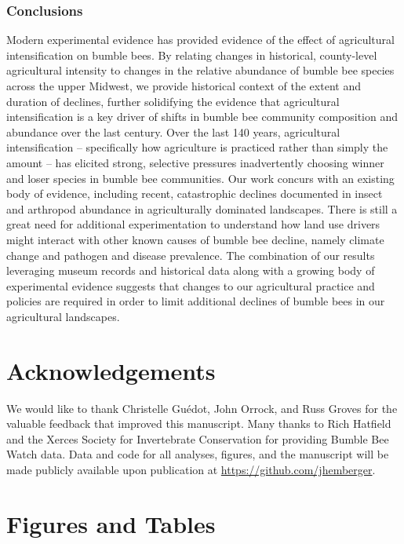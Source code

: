 \documentclass[11pt,]{article}
\begin{document}
\hypertarget{conclusions}{%
\subsubsection{Conclusions}\label{conclusions}}

Modern experimental evidence has provided evidence of the effect of
agricultural intensification on bumble bees. By relating changes in
historical, county-level agricultural intensity to changes in the
relative abundance of bumble bee species across the upper Midwest, we
provide historical context of the extent and duration of declines,
further solidifying the evidence that agricultural intensification is a
key driver of shifts in bumble bee community composition and abundance
over the last century. Over the last 140 years, agricultural
intensification -- specifically how agriculture is practiced rather than
simply the amount -- has elicited strong, selective pressures
inadvertently choosing winner and loser species in bumble bee
communities. Our work concurs with an existing body of evidence,
including recent, catastrophic declines documented in insect and
arthropod abundance in agriculturally dominated landscapes. There is
still a great need for additional experimentation to understand how land
use drivers might interact with other known causes of bumble bee
decline, namely climate change and pathogen and disease prevalence. The
combination of our results leveraging museum records and historical data
along with a growing body of experimental evidence suggests that changes
to our agricultural practice and policies are required in order to limit
additional declines of bumble bees in our agricultural landscapes.

\hypertarget{acknowledgements}{%
\section{Acknowledgements}\label{acknowledgements}}

We would like to thank Christelle Guédot, John Orrock, and Russ Groves
for the valuable feedback that improved this manuscript. Many thanks to
Rich Hatfield and the Xerces Society for Invertebrate Conservation for
providing Bumble Bee Watch data. Data and code for all analyses,
figures, and the manuscript will be made publicly available upon
publication at \url{https://github.com/jhemberger}. \clearpage

\newpage

\hypertarget{figures-and-tables}{%
\section{Figures and Tables}\label{figures-and-tables}}
\end{document}
